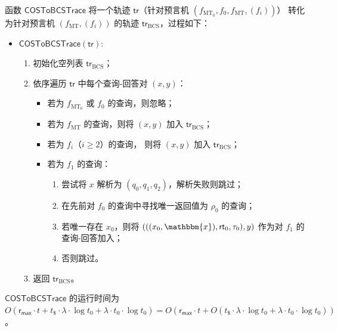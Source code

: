 \documentclass[american,singlepageview]{snargs-book-zh}
\newcommand{\Instance}{\mathbbm{x}}
\newcommand{\ProtoSalt}{\tau}
\newcommand{\ProtoRandomnessComplexity}{\mathsf{r}}
\newcommand{\RoundIndex}{i}
\newcommand{\IOPVerifierRandomMessage}{\rho}
\newcommand{\IOPRandomnessComplexity}{\ProtoRandomnessComplexity}
\newcommand{\IOPMaxRandomnessComplexity}{\IOPRandomnessComplexity_{{\scriptscriptstyle\mathsf{max}}}}
\newcommand{\IndexRoundSubscript}{0}
\newcommand{\ROFunction}{f}
\newcommand{\ROQueryBound}{t}
\newcommand{\SecurityParameter}{\lambda}
\newcommand{\ROQuery}{x}
\newcommand{\ROAnswer}{y}
\newcommand{\ROTrace}{\mathsf{tr}}
\newcommand{\ROTreeSymbol}{\MTSubscript}
\newcommand{\RORandSymbol}{\scriptscriptstyle \mathsf{\$}}
\newcommand{\ROTreeFunction}{\ROFunction_{\ROTreeSymbol}}
\newcommand{\RORandRoundFunction}[1]{\ROFunction_{#1}}
\newcommand{\RORandQueryBound}{\ROQueryBound_{\RORandSymbol}}
\newcommand{\MTSubscript}{{\scriptscriptstyle\mathrm{MT}}}
\newcommand{\MTCommitment}{\mathsf{rt}}
\newcommand{\RandSaltString}{\ProtoSalt}
\newcommand{\HashedIndex}{\IOPVerifierRandomMessage_{\IndexRoundSubscript}}
\newcommand{\BCSSubscript}{\scriptscriptstyle\mathrm{BCS}}
\newcommand{\COSToBCSTrace}{\mathsf{COSToBCSTrace}}
\newcommand{\ExtraTimeofCOSToBCSProver}{O(\RORandQueryBound \cdot \SecurityParameter \cdot \log \ROIndexHashQueryBound + \SecurityParameter \cdot \ROIndexHashQueryBound \cdot \log \ROIndexHashQueryBound)}
\newcommand{\TimeofCOSToBCSTrace}{O(\IOPMaxRandomnessComplexity \cdot \ROQueryBound + \RORandQueryBound \cdot \SecurityParameter \cdot \log \ROIndexHashQueryBound + \SecurityParameter \cdot \ROIndexHashQueryBound \cdot \log \ROIndexHashQueryBound)}
\newcommand{\ROIndexHashFunction}{\ROFunction_{\IndexRoundSubscript}}
\newcommand{\ROIndexHashQueryBound}{\ROQueryBound_{\IndexRoundSubscript}}
\newcommand{\ROIndexTreeFunction}{\ROFunction_{\ROTreeSymbol_{\IndexRoundSubscript}}}
\begin{document}
\begin{construction}
\label{construction:cos-to-bcs-trace}
函数 $\COSToBCSTrace$ 将一个轨迹
$\ROTrace$（针对预言机
$(\ROIndexTreeFunction,\ROIndexHashFunction,\ROTreeFunction,(\RORandRoundFunction{\RoundIndex}))$）
转化为针对预言机
$(\ROTreeFunction,(\RORandRoundFunction{\RoundIndex}))$ 的轨迹
$\ROTrace_{\BCSSubscript}$，过程如下：
\begin{itemize}[noitemsep]
\item[]%
$\COSToBCSTrace(\ROTrace)$:
\begin{enumerate}[nolistsep]
  \item 初始化空列表 $\ROTrace_{\BCSSubscript}$；
  \item 依序遍历 $\ROTrace$ 中每个查询-回答对 $(\ROQuery,\ROAnswer)$：
    \begin{itemize}[noitemsep]
      \item 若为 $\ROIndexTreeFunction$ 或 $\ROIndexHashFunction$ 的查询，则忽略；
      \item 若为 $\ROTreeFunction$ 的查询，则将 $(\ROQuery,\ROAnswer)$ 加入 $\ROTrace_{\BCSSubscript}$；
      \item 若为 $\RORandRoundFunction{\RoundIndex}$（$\RoundIndex\ge2$）的查询，
            则将 $(\ROQuery,\ROAnswer)$ 加入 $\ROTrace_{\BCSSubscript}$；
      \item 若为 $\RORandRoundFunction{1}$ 的查询：
        \begin{enumerate}[noitemsep]
          \item 尝试将 $\ROQuery$ 解析为 $(q_0,q_1,q_2)$，解析失败则跳过；
          \item 在先前对 $\ROIndexHashFunction$ 的查询中寻找唯一返回值为 $\HashedIndex$ 的查询；
          \item 若唯一存在 $\ROQuery_{0}$，则将
            $(((\ROQuery_{0},\Instance),\MTCommitment_{0},\RandSaltString_{0}),\ROAnswer)$
            作为对 $\RORandRoundFunction{1}$ 的查询-回答加入；
          \item 否则跳过。
        \end{enumerate}
    \end{itemize}
  \item 返回 $\ROTrace_{\BCSSubscript}$。
\end{enumerate}
\end{itemize}

$\COSToBCSTrace$ 的运行时间为
$\TimeofCOSToBCSTrace=O(\IOPMaxRandomnessComplexity\cdot\ROQueryBound+\ExtraTimeofCOSToBCSProver)$。
\end{construction}
\end{document}
